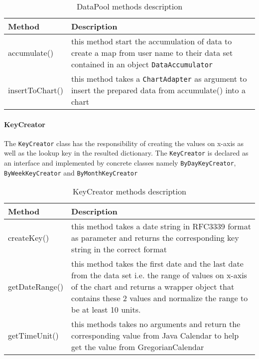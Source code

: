 \begin{table}[h]
\begin{center}
    \begin{tabular}{| l | p{12cm} |}
        \hline Method & Description \\
        \hline accumulate() & 
            this method start the accumulation of data to create a map from user name to their data set contained in an
            object \texttt{DataAccumulator} \\
        \hline insertToChart() &
            this method takes a \texttt{ChartAdapter} as argument to insert the prepared data from accumulate() into a
            chart \\
        \hline
    \end{tabular}
    \caption{DataPool methods description}
\end{center}
\end{table}

\paragraph{KeyCreator}
The \texttt{KeyCreator} class has the responsibility of creating the values on x-axis as well as the lookup key in the
resulted dictionary. The \texttt{KeyCreator} is declared as an interface and implemented by concrete classes namely
\texttt{ByDayKeyCreator}, \texttt{ByWeekKeyCreator} and \texttt{ByMonthKeyCreator}


\begin{table}[h]
\begin{center}
    \begin{tabular}{| l | p{12cm} |}
        \hline Method & Description \\
        \hline createKey() & 
            this method takes a date string in RFC3339 format as parameter and returns the corresponding key string in
            the correct format \\
        \hline getDateRange() &
            this method takes the first date and the last date from the data set i.e. the range of values on x-axis of
            the chart and returns a wrapper object that contains these 2 values and normalize the range to be at least
            10 units. \\
        \hline getTimeUnit() &
            this methods takes no arguments and return the corresponding value from Java Calendar to help get the value
            from GregorianCalendar \\
        \hline
    \end{tabular}
    \caption{KeyCreator methods description}
\end{center}
\end{table}

